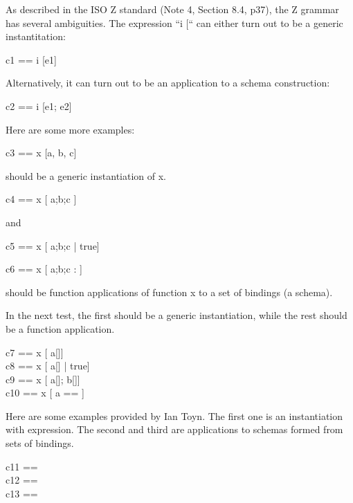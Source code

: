 As described in the ISO Z standard (Note 4, Section 8.4, p37), the Z
grammar has several ambiguities.  The expression ``i [``
can either turn out to be a generic instantitation:

\begin{zed}
  c1 == i [e1]
\end{zed}

Alternatively, it can turn out to be an application to a schema construction:

\begin{zed}
  c2 == i [e1; e2]
\end{zed}

Here are some more examples:

\begin{zed}
  c3 == x [a, b, c]
\end{zed}

should be a generic instantiation of x.

\begin{zed}
  c4 == x [ a;b;c ]
\end{zed}

and

\begin{zed}
  c5 == x [ a;b;c | true]
\end{zed}

\begin{zed}
  c6 == x [ a;b;c : \nat]
\end{zed}

should be function applications of function x to a set of bindings (a schema).

In the next test, the first should be a generic instantiation, while the 
rest should be a function application.
\begin{zed}
  c7 == x [ a[\nat]]\\
  c8 == x [ a[\nat] | true]\\
  c9 == x [ a[\nat]; b[\nat]]\\
  c10 == x [ a == \nat]
\end{zed}

Here are some examples provided by Ian Toyn.  The first one is an
instantiation with \mu expression.  The second and third are
applications to schemas formed from sets of bindings.

\begin{zed}
  c11 == \emptyset [ \mu a == 42 @ \{ a \} ] \\
  c12 == \emptyset [ \{ \lblot x == 42 \rblot \} ;
                     \{ \lblot x == 42 \rblot \} ] \\
  c13 == \emptyset [ \{ ( \mu a == \lblot x == 42 \rblot ) \} ;
                     \{ \lblot x == 42 \rblot \} ]
\end{zed}
